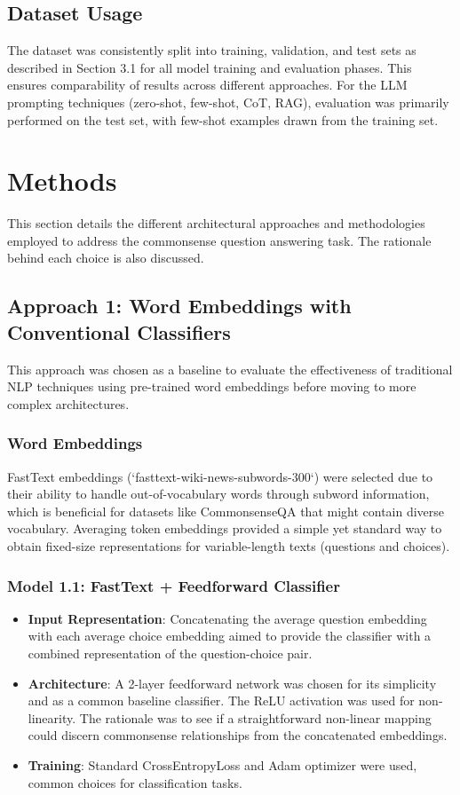 \documentclass[10.5pt]{article}
\begin{document}
\subsection{Dataset Usage}
The dataset was consistently split into training, validation, and test sets as described in Section 3.1 for all model training and evaluation phases. This ensures comparability of results across different approaches. For the LLM prompting techniques (zero-shot, few-shot, CoT, RAG), evaluation was primarily performed on the test set, with few-shot examples drawn from the training set.

\newpage
\section{Methods}
This section details the different architectural approaches and methodologies employed to address the commonsense question answering task. The rationale behind each choice is also discussed.

\subsection{Approach 1: Word Embeddings with Conventional Classifiers}
This approach was chosen as a baseline to evaluate the effectiveness of traditional NLP techniques using pre-trained word embeddings before moving to more complex architectures.
\subsubsection{Word Embeddings}
FastText embeddings (`fasttext-wiki-news-subwords-300`) were selected due to their ability to handle out-of-vocabulary words through subword information, which is beneficial for datasets like CommonsenseQA that might contain diverse vocabulary. Averaging token embeddings provided a simple yet standard way to obtain fixed-size representations for variable-length texts (questions and choices).

\subsubsection{Model 1.1: FastText + Feedforward Classifier}
\begin{itemize}
    \item \textbf{Input Representation}: Concatenating the average question embedding with each average choice embedding aimed to provide the classifier with a combined representation of the question-choice pair.
    \item \textbf{Architecture}: A 2-layer feedforward network was chosen for its simplicity and as a common baseline classifier. The ReLU activation was used for non-linearity. The rationale was to see if a straightforward non-linear mapping could discern commonsense relationships from the concatenated embeddings.
    \item \textbf{Training}: Standard CrossEntropyLoss and Adam optimizer were used, common choices for classification tasks.
\end{itemize}
\end{document}
